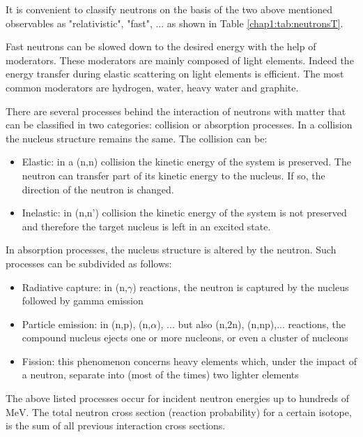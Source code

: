 \begin{refsection}
  It is convenient to classify neutrons on the basis of the two above mentioned observables as "relativistic", "fast", ... as shown in Table \ref{chap1:tab:neutronsT}.

  

  Fast neutrons can be slowed down to the desired energy with the help of moderators. These moderators are mainly composed of light elements. Indeed the energy transfer during elastic scattering on light elements is efficient. The most common moderators are hydrogen, water, heavy water and graphite.

  There are several processes behind the interaction of neutrons with matter \cite{Leo1994} that can be classified in two categories: collision or absorption processes.
  In a collision the nucleus structure remains the same. The collision can be:
  \begin{itemize}
    \item Elastic: in a (n,n) collision the kinetic energy of the system is preserved. The neutron can transfer part of its kinetic energy to the nucleus. If so, the direction of the neutron is changed.
    \item Inelastic: in (n,n') collision the kinetic energy of the system is not preserved and therefore the target nucleus is left in an excited state.
  \end{itemize}
  In absorption processes, the nucleus structure is altered by the neutron.
  Such processes can be subdivided as follows:
  \begin{itemize}
    \item Radiative capture: in (n,$\gamma$) reactions, the neutron is captured by the nucleus followed by gamma emission
    \item Particle emission: in (n,p), (n,$\alpha$), ... but also (n,2n), (n,np),... reactions, the compound nucleus ejects one or more nucleons, or even a cluster of nucleons
    \item Fission: this phenomenon concerns heavy elements which, under the impact of a neutron, separate into (most of the times) two lighter elements
  \end{itemize}

  The above listed processes occur for incident neutron energies up to hundreds of $\mathrm{MeV}$. The total neutron cross section (reaction probability) for a certain isotope, is the sum of all previous interaction cross sections.


\end{refsection}
